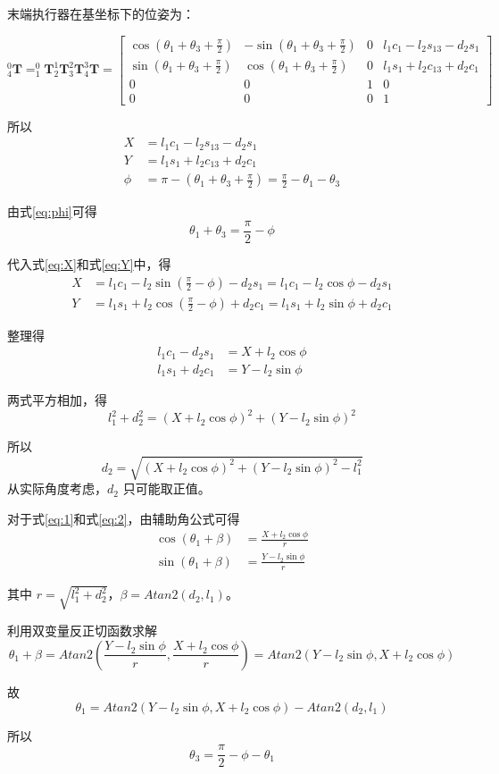 \documentclass{homework}
\begin{document}
\begin{sol}
末端执行器在基坐标下的位姿为：

\[
  _4^0\mathbf{T} = _1^0\mathbf{T} _2^1\mathbf{T} _3^2\mathbf{T} _4^3\mathbf{T} =
  \begin{bmatrix}
    \cos(\theta_1 + \theta_3 + \frac{\pi}{2}) & -\sin(\theta_1 + \theta_3 + \frac{\pi}{2}) & 0 & l_1 c_1 - l_2 s_{13} - d_2 s_1 \\
    \sin(\theta_1 + \theta_3 + \frac{\pi}{2}) & \cos(\theta_1 + \theta_3 + \frac{\pi}{2}) & 0 & l_1 s_1 + l_2 c_{13} + d_2 c_1 \\
    0 & 0 & 1 & 0 \\
    0 & 0 & 0 & 1
  \end{bmatrix}
\]

所以 
\begin{align}
  X &= l_1 c_1 - l_2 s_{13} - d_2 s_1 \label{eq:X} \\
  Y &= l_1 s_1 + l_2 c_{13} + d_2 c_1 \label{eq:Y} \\
  \phi &= \pi - (\theta_1 + \theta_3 + \frac{\pi}{2}) = \frac{\pi}{2} - \theta_1 - \theta_3 \label{eq:phi}
\end{align}

由式\eqref{eq:phi}可得
\[
  \theta_1 + \theta_3 = \frac{\pi}{2} - \phi
\]

代入式\eqref{eq:X}和式\eqref{eq:Y}中，得
\begin{align*}
  X &= l_1 c_1 - l_2 \sin(\frac{\pi}{2} - \phi) - d_2 s_1 = l_1 c_1 - l_2 \cos \phi - d_2 s_1 \\
  Y &= l_1 s_1 + l_2 \cos(\frac{\pi}{2} - \phi) + d_2 c_1 = l_1 s_1 + l_2 \sin \phi + d_2 c_1
\end{align*}

整理得
\begin{align}
  l_1 c_1 - d_2 s_1 &= X + l_2 \cos \phi \label{eq:1} \\
  l_1 s_1 + d_2 c_1 &= Y - l_2 \sin \phi \label{eq:2}
\end{align}

两式平方相加，得
\[
  l_1^2 + d_2^2 = (X + l_2 \cos \phi)^2 + (Y - l_2 \sin \phi)^2
\]

所以
\[
  d_2 = \sqrt{(X + l_2 \cos \phi)^2 + (Y - l_2 \sin \phi)^2 - l_1^2}
\]
从实际角度考虑，$ d_2 $ 只可能取正值。

对于式\eqref{eq:1}和式\eqref{eq:2}，由辅助角公式可得
\begin{align*}
  \cos(\theta_1 + \beta) &= \frac{X + l_2 \cos \phi}{r} \\
  \sin(\theta_1 + \beta) &= \frac{Y - l_2 \sin \phi}{r}
\end{align*}

其中 $ r = \sqrt{l_1^2 + d_2^2} $，$ \beta = Atan2(d_2, l_1) $。

利用双变量反正切函数求解
\[
  \theta_1 + \beta = Atan2(\frac{Y - l_2 \sin \phi}{r}, \frac{X + l_2 \cos \phi}{r}) = Atan2(Y - l_2 \sin \phi, X + l_2 \cos \phi)
\]

故
\[
  \theta_1 = Atan2(Y - l_2 \sin \phi, X + l_2 \cos \phi) - Atan2(d_2, l_1)
\]

所以
\[
  \theta_3 = \frac{\pi}{2} - \phi - \theta_1
\]

\end{sol}
\end{document}
